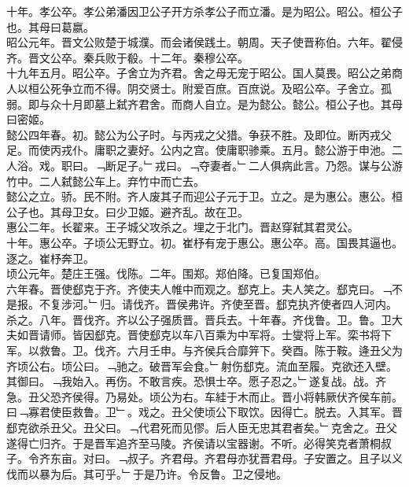 \documentclass{zhvt-classic}
\begin{document}
\hspace*{2em}十年。孝公卒。孝公弟潘因卫公子开方杀孝公子而立潘。是为昭公。昭公。桓公子也。其母曰葛嬴。\\
\hspace*{2em}昭公元年。晋文公败楚于城濮。而会诸侯践土。朝周。天子使晋称伯。六年。翟侵齐。晋文公卒。秦兵败于殽。十二年。秦穆公卒。\\
\hspace*{2em}十九年五月。昭公卒。子舍立为齐君。舍之母无宠于昭公。国人莫畏。昭公之弟商人以桓公死争立而不得。阴交贤士。附爱百庶。百庶说。及昭公卒。子舍立。孤弱。即与众十月即墓上弑齐君舍。而商人自立。是为懿公。懿公。桓公子也。其母曰密姬。\\
\hspace*{2em}懿公四年春。初。懿公为公子时。与丙戎之父猎。争获不胜。及即位。断丙戎父足。而使丙戎仆。庸职之妻好。公内之宫。使庸职骖乘。五月。懿公游于申池。二人浴。戏。职曰。﹁断足子。﹂戎曰。﹁夺妻者。﹂二人俱病此言。乃怨。谋与公游竹中。二人弑懿公车上。弃竹中而亡去。\\
\hspace*{2em}懿公之立。骄。民不附。齐人废其子而迎公子元于卫。立之。是为惠公。惠公。桓公子也。其母卫女。曰少卫姬。避齐乱。故在卫。\\
\hspace*{2em}惠公二年。长翟来。王子城父攻杀之。埋之于北门。晋赵穿弑其君灵公。\\
\hspace*{2em}十年。惠公卒。子顷公无野立。初。崔杼有宠于惠公。惠公卒。高。国畏其逼也。逐之。崔杼奔卫。\\
\hspace*{2em}顷公元年。楚庄王强。伐陈。二年。围郑。郑伯降。已复国郑伯。\\
\hspace*{2em}六年春。晋使郄克于齐。齐使夫人帷中而观之。郄克上。夫人笑之。郄克曰。﹁不是报。不复涉河。﹂归。请伐齐。晋侯弗许。齐使至晋。郄克执齐使者四人河内。杀之。八年。晋伐齐。齐以公子强质晋。晋兵去。十年春。齐伐鲁。卫。鲁。卫大夫如晋请师。皆因郄克。晋使郄克以车八百乘为中军将。士燮将上军。栾书将下军。以救鲁。卫。伐齐。六月壬申。与齐侯兵合靡笄下。癸酉。陈于鞍。逄丑父为齐顷公右。顷公曰。﹁驰之。破晋军会食。﹂射伤郄克。流血至履。克欲还入壁。其御曰。﹁我始入。再伤。不敢言疾。恐惧士卒。愿子忍之。﹂遂复战。战。齐急。丑父恐齐侯得。乃易处。顷公为右。车絓于木而止。晋小将韩厥伏齐侯车前。曰﹁寡君使臣救鲁。卫﹂。戏之。丑父使顷公下取饮。因得亡。脱去。入其军。晋郄克欲杀丑父。丑父曰。﹁代君死而见僇。后人臣无忠其君者矣。﹂克舍之。丑父遂得亡归齐。于是晋军追齐至马陵。齐侯请以宝器谢。不听。必得笑克者萧桐叔子。令齐东亩。对曰。﹁叔子。齐君母。齐君母亦犹晋君母。子安置之。且子以义伐而以暴为后。其可乎。﹂于是乃许。令反鲁。卫之侵地。\\
\end{document}
